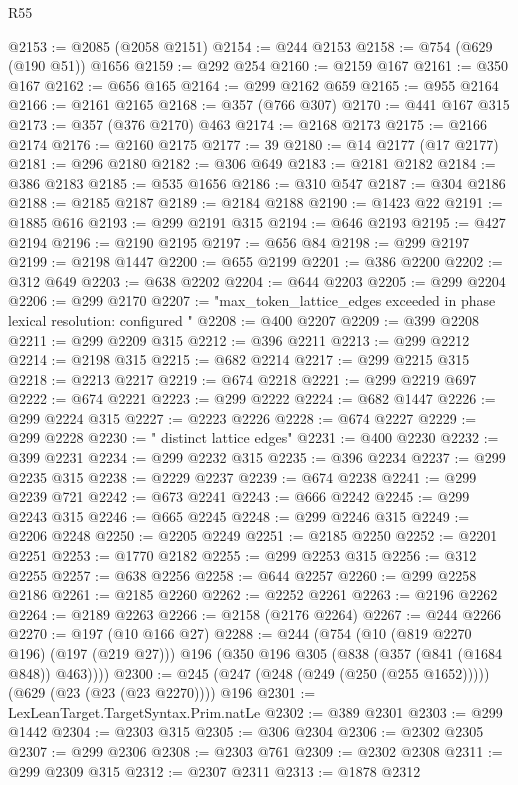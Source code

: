 \begin{lexlean}{R55}
\begin{coremodule}
@2153 := @2085 (@2058 @2151)
@2154 := @244 @2153
@2158 := @754 (@629 (@190 @51)) @1656
@2159 := @292 @254
@2160 := @2159 @167
@2161 := @350 @167
@2162 := @656 @165
@2164 := @299 @2162 @659
@2165 := @955 @2164
@2166 := @2161 @2165
@2168 := @357 (@766 @307)
@2170 := @441 @167 @315
@2173 := @357 (@376 @2170) @463
@2174 := @2168 @2173
@2175 := @2166 @2174
@2176 := @2160 @2175
@2177 := 39
@2180 := @14 @2177 (@17 @2177)
@2181 := @296 @2180
@2182 := @306 @649
@2183 := @2181 @2182
@2184 := @386 @2183
@2185 := @535 @1656
@2186 := @310 @547
@2187 := @304 @2186
@2188 := @2185 @2187
@2189 := @2184 @2188
@2190 := @1423 @22
@2191 := @1885 @616
@2193 := @299 @2191 @315
@2194 := @646 @2193
@2195 := @427 @2194
@2196 := @2190 @2195
@2197 := @656 @84
@2198 := @299 @2197
@2199 := @2198 @1447
@2200 := @655 @2199
@2201 := @386 @2200
@2202 := @312 @649
@2203 := @638 @2202
@2204 := @644 @2203
@2205 := @299 @2204
@2206 := @299 @2170
@2207 := "max_token_lattice_edges exceeded in phase lexical resolution: configured "
@2208 := @400 @2207
@2209 := @399 @2208
@2211 := @299 @2209 @315
@2212 := @396 @2211
@2213 := @299 @2212
@2214 := @2198 @315
@2215 := @682 @2214
@2217 := @299 @2215 @315
@2218 := @2213 @2217
@2219 := @674 @2218
@2221 := @299 @2219 @697
@2222 := @674 @2221
@2223 := @299 @2222
@2224 := @682 @1447
@2226 := @299 @2224 @315
@2227 := @2223 @2226
@2228 := @674 @2227
@2229 := @299 @2228
@2230 := " distinct lattice edges"
@2231 := @400 @2230
@2232 := @399 @2231
@2234 := @299 @2232 @315
@2235 := @396 @2234
@2237 := @299 @2235 @315
@2238 := @2229 @2237
@2239 := @674 @2238
@2241 := @299 @2239 @721
@2242 := @673 @2241
@2243 := @666 @2242
@2245 := @299 @2243 @315
@2246 := @665 @2245
@2248 := @299 @2246 @315
@2249 := @2206 @2248
@2250 := @2205 @2249
@2251 := @2185 @2250
@2252 := @2201 @2251
@2253 := @1770 @2182
@2255 := @299 @2253 @315
@2256 := @312 @2255
@2257 := @638 @2256
@2258 := @644 @2257
@2260 := @299 @2258 @2186
@2261 := @2185 @2260
@2262 := @2252 @2261
@2263 := @2196 @2262
@2264 := @2189 @2263
@2266 := @2158 (@2176 @2264)
@2267 := @244 @2266
@2270 := @197 (@10 @166 @27)
@2288 := @244
    (@754
      (@10 (@819 @2270 @196) (@197 (@219 @27)))
      @196
      (@350 @196 @305 (@838 (@357 (@841 (@1684 @848)) @463))))
@2300 := @245 (@247 (@248 (@249 (@250 (@255 @1652))))) (@629 (@23 (@23 (@23 @2270)))) @196
@2301 := LexLeanTarget.TargetSyntax.Prim.natLe
@2302 := @389 @2301
@2303 := @299 @1442
@2304 := @2303 @315
@2305 := @306 @2304
@2306 := @2302 @2305
@2307 := @299 @2306
@2308 := @2303 @761
@2309 := @2302 @2308
@2311 := @299 @2309 @315
@2312 := @2307 @2311
@2313 := @1878 @2312

\end{coremodule}
\end{lexlean}
